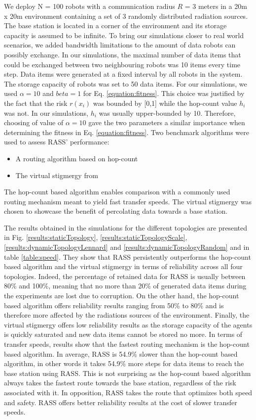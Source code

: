 We deploy N = 100 robots with a communication radius $R$ = 3 meters in a 20m x 20m environment containing a set of 3 randomly distributed radiation sources. The base station is located in a corner of the environment and its storage capacity is assumed to be infinite. To bring our simulations closer to real world scenarios, we added bandwidth limitations to the amount of data robots can possibly exchange. In our simulations, the maximal number of data items that could be exchanged between two neighbouring robots was 10 items every time step. Data items were generated at a fixed interval by all robots in the system. The storage capacity of robots was set to 50 data items. For our simulations, we used $\alpha = 10$ and $beta = 1$ for Eq. \ref{equation:fitness}. This choice was justified by the fact that the risk $r({x_i})$ was bounded by [0,1] while the hop-count value $h_i$ was not. In our simulations, $h_i$ was usually upper-bounded by 10. Therefore, choosing of value of $\alpha = 10$ gave the two parameters a similar importance when determining the fitness in Eq. \ref{equation:fitness}. Two benchmark algorithms were used to assess RASS' performance:

\begin{itemize}
    \item A routing algorithm based on hop-count 
    \item The virtual stigmergy from \cite{pinciroliTuple2016}
\end{itemize}

The hop-count based algorithm enables comparison with a commonly used routing mechanism meant to yield fast transfer speeds. The virtual stigmergy was chosen to showcase the benefit of percolating data towards a base station.

The results obtained in the simulations for the different topologies are presented in Fig. \ref{results:staticTopology}, \ref{results:staticTopologyScale}, \ref{results:dynamicTopologyLennard} and \ref{results:dynamicTopologyRandom} and in table \ref{table:speed}. They show that RASS persistently outperforms the hop-count based algorithm and the virtual stigmergy in terms of reliability across all four topologies. Indeed, the percentage of retained data for RASS is usually between 80\% and 100\%, meaning that no more than 20\% of generated data items during the experiments are lost due to corruption. On the other hand, the hop-count based algorithm offers reliability results ranging from 50\% to 80\% and is therefore more affected by the radiations sources of the environment. Finally, the virtual stigmergy offers low reliability results as the storage capacity of the agents is quickly saturated and new data items cannot be stored no more. In terms of transfer speeds, results show that the fastest routing mechanism is the hop-count based algorithm. In average, RASS is 54.9\% slower than the hop-count based algorithm, in other words it takes 54.9\% more steps for data items to reach the base station using RASS. This is not surprising as the hop-count based algorithm always takes the fastest route towards the base station, regardless of the risk associated with it. In opposition, RASS takes the route that optimizes both speed and safety. RASS offers better reliability results at the cost of slower transfer speeds.  

